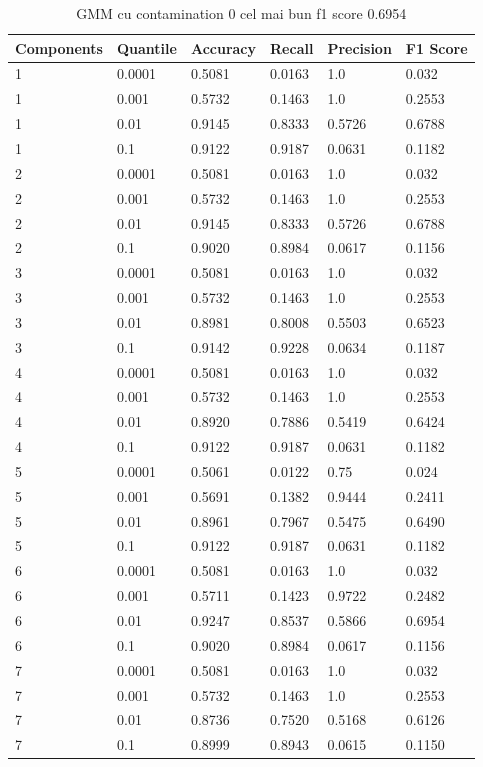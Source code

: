 \begin{table}[H]
    \caption{GMM cu contamination 0 cel mai bun f1 score 0.6954}
    \centering
    \begin{tabularx}{\textwidth}{
        |X
        |X
        |X
        |X
        |X
        |X|
    }
    \hline
    {Components} & {Quantile} & {Accuracy} & {Recall} & {Precision} & {F1 Score} \\
    \hline
    1 & 0.0001 & 0.5081 & 0.0163 & 1.0 & 0.032 \\
    1 & 0.001 & 0.5732 & 0.1463 & 1.0 & 0.2553 \\
    1 & 0.01 & 0.9145 & 0.8333 & 0.5726 & 0.6788 \\
    1 & 0.1 & 0.9122 & 0.9187 & 0.0631 & 0.1182 \\
    2 & 0.0001 & 0.5081 & 0.0163 & 1.0 & 0.032 \\
    2 & 0.001 & 0.5732 & 0.1463 & 1.0 & 0.2553 \\
    2 & 0.01 & 0.9145 & 0.8333 & 0.5726 & 0.6788 \\
    2 & 0.1 & 0.9020 & 0.8984 & 0.0617 & 0.1156 \\
    3 & 0.0001 & 0.5081 & 0.0163 & 1.0 & 0.032 \\
    3 & 0.001 & 0.5732 & 0.1463 & 1.0 & 0.2553 \\
    3 & 0.01 & 0.8981 & 0.8008 & 0.5503 & 0.6523 \\
    3 & 0.1 & 0.9142 & 0.9228 & 0.0634 & 0.1187 \\
    4 & 0.0001 & 0.5081 & 0.0163 & 1.0 & 0.032 \\
    4 & 0.001 & 0.5732 & 0.1463 & 1.0 & 0.2553 \\
    4 & 0.01 & 0.8920 & 0.7886 & 0.5419 & 0.6424 \\
    4 & 0.1 & 0.9122 & 0.9187 & 0.0631 & 0.1182 \\
    5 & 0.0001 & 0.5061 & 0.0122 & 0.75 & 0.024 \\
    5 & 0.001 & 0.5691 & 0.1382 & 0.9444 & 0.2411 \\
    5 & 0.01 & 0.8961 & 0.7967 & 0.5475 & 0.6490 \\
    5 & 0.1 & 0.9122 & 0.9187 & 0.0631 & 0.1182 \\
    6 & 0.0001 & 0.5081 & 0.0163 & 1.0 & 0.032 \\
    6 & 0.001 & 0.5711 & 0.1423 & 0.9722 & 0.2482 \\
    6 & 0.01 & 0.9247 & 0.8537 & 0.5866 & 0.6954 \\
    6 & 0.1 & 0.9020 & 0.8984 & 0.0617 & 0.1156 \\
    7 & 0.0001 & 0.5081 & 0.0163 & 1.0 & 0.032 \\
    7 & 0.001 & 0.5732 & 0.1463 & 1.0 & 0.2553 \\
    7 & 0.01 & 0.8736 & 0.7520 & 0.5168 & 0.6126 \\
    7 & 0.1 & 0.8999 & 0.8943 & 0.0615 & 0.1150 \\
    \hline
    \end{tabularx}
\end{table}
